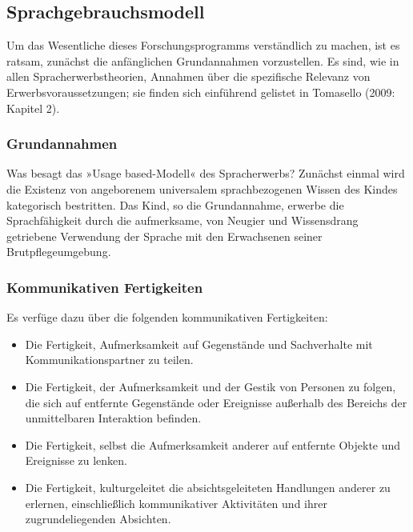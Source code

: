 \documentclass[
  letterpaper,
]{scrbook}
\begin{document}
\hypertarget{sprachgebrauchsmodell}{%
\subsection{Sprachgebrauchsmodell}\label{sprachgebrauchsmodell}}

Um das Wesentliche dieses Forschungsprogramms verständlich zu machen,
ist es ratsam, zunächst die anfänglichen Grundannahmen vorzustellen. Es
sind, wie in allen Spracherwerbstheorien, Annahmen über die spezifische
Relevanz von Erwerbsvoraussetzungen; sie finden sich einführend gelistet
in Tomasello (2009: Kapitel 2).

\hypertarget{grundannahmen}{%
\subsubsection{\texorpdfstring{\textbf{Grundannahmen}}{Grundannahmen}}\label{grundannahmen}}

Was besagt das »Usage based-Modell« des Spracherwerbs? Zunächst einmal
wird die Existenz von angeborenem universalem sprachbezogenen Wissen des
Kindes kategorisch bestritten. Das Kind, so die Grundannahme, erwerbe
die Sprachfähigkeit durch die aufmerksame, von Neugier und Wissensdrang
getriebene Verwendung der Sprache mit den Erwachsenen seiner
Brutpflegeumgebung.

\hypertarget{kommunikativen-fertigkeiten}{%
\subsubsection{Kommunikativen
Fertigkeiten}\label{kommunikativen-fertigkeiten}}

Es verfüge dazu über die folgenden kommunikativen Fertigkeiten:

\begin{itemize}
\item
  Die Fertigkeit, Aufmerksamkeit auf Gegenstände und Sachverhalte mit
  Kommunikationspartner zu teilen.
\item
  Die Fertigkeit, der Aufmerksamkeit und der Gestik von Personen zu
  folgen, die sich auf entfernte Gegenstände oder Ereignisse außerhalb
  des Bereichs der unmittelbaren Interaktion befinden.
\item
  Die Fertigkeit, selbst die Aufmerksamkeit anderer auf entfernte
  Objekte und Ereignisse zu lenken.
\item
  Die Fertigkeit, kulturgeleitet die absichtsgeleiteten Handlungen
  anderer zu erlernen, einschließlich kommunikativer Aktivitäten und
  ihrer zugrundeliegenden Absichten.
\end{itemize}
\end{document}

